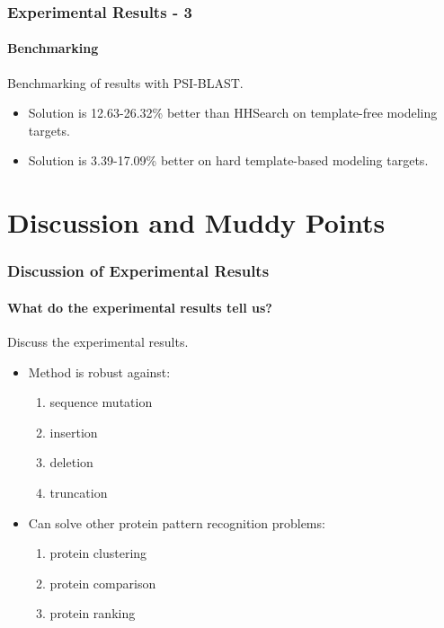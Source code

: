 \documentclass[xcolor={usenames,dvipsnames},hyperref={hyperindex,bookmarks}]{beamer}
\begin{document}
\frame
{
	\frametitle{Experimental Results - 3}
	\framesubtitle{Benchmarking}

	Benchmarking of results with PSI-BLAST.
	\begin{itemize}
	\item Solution is 12.63-26.32\% better than HHSearch on template-free modeling targets.
	\item Solution is 3.39-17.09\% better on hard template-based modeling targets.
	\end{itemize}

}











\section{Discussion and Muddy Points}


\frame
{
	\frametitle{Discussion of Experimental Results}
	\framesubtitle{What do the experimental results tell us?}

	Discuss the experimental results.
	\begin{itemize}
	\item Method is robust against: 
		\begin{enumerate} 
		\item sequence mutation
		\item insertion
		\item deletion
		\item truncation
		\end{enumerate}
	\item Can solve other protein pattern recognition problems:
		\begin{enumerate} 
		\item protein clustering
		\item protein comparison
		\item protein ranking
		\end{enumerate}
	\end{itemize}

}
\end{document}
